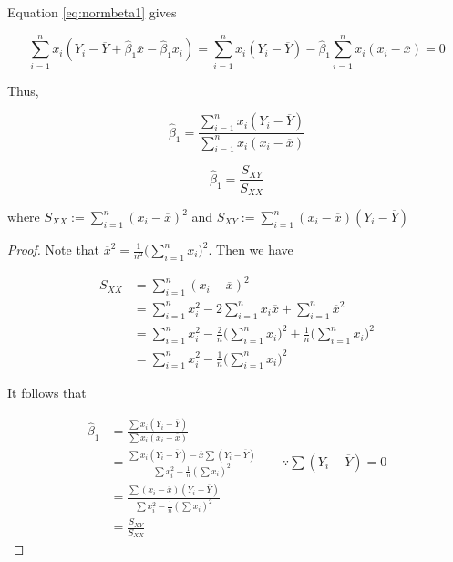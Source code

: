 \documentclass[]{book}
\theoremstyle{definition}
\theoremstyle{definition}
\theoremstyle{definition}
\theoremstyle{remark}
\let\BeginKnitrBlock\begin \let\EndKnitrBlock\end
\begin{document}
Equation \eqref{eq:normbeta1} gives

\[\sum_{i = 1}^n x_i (Y_i - \overline{Y} + \hat\beta_1\overline{x} - \hat\beta_1 x_i) = \sum_{i = 1}^n x_i(Y_i - \overline{Y}) - \hat\beta_1\sum_{i = 1}^n x_i (x_i - \overline{x}) = 0\]

Thus,

\[\hat\beta_1 = \frac{\sum\limits_{i = 1}^nx_i(Y_i - \overline{Y})}{\sum\limits_{i = 1}^n x_i (x_i - \overline{x})}\]

\BeginKnitrBlock{remark}
\iffalse{} {Remark. } \fi{}\[\hat\beta_1 = \frac{S_{XY}}{S_{XX}}\]

where \(S_{XX} := \sum\limits_{i = 1}^n (x_i - \overline{x})^2\) and
\(S_{XY} := \sum\limits_{i = 1}^n (x_i - \overline{x})(Y_i - \overline{Y})\)
\EndKnitrBlock{remark}

\BeginKnitrBlock{proof}
\iffalse{} {Proof. } \fi{}Note that
\(\overline{x}^2 = \frac{1}{n^2}\bigg(\sum\limits_{i = 1}^n x_i\bigg)^2\).
Then we have

\begin{equation}
  \begin{split}
    S_{XX} & = \sum_{i = 1}^n (x_i - \overline{x})^2 \\
    & = \sum_{i = 1}^n x_i^2 - 2\sum_{i = 1}^n x_i \overline{x} + \sum_{i = 1}^n\overline{x}^2 \\
    & = \sum_{i = 1}^n x_i^2 - \frac{2}{n}\bigg(\sum\limits_{i = 1}^n x_i\bigg)^2 + \frac{1}{n}\bigg(\sum\limits_{i = 1}^n x_i\bigg)^2 \\
    & = \sum_{i = 1}^n x_i^2 - \frac{1}{n}\bigg(\sum\limits_{i = 1}^n x_i\bigg)^2
  \end{split}
  \label{eq:sxx}
\end{equation}

It follows that

\begin{equation*}
  \begin{split}
    \hat\beta_1 & = \frac{\sum x_i(Y_i - \overline{Y})}{\sum x_i (x_i - \overline{x})} \\
    & = \frac{\sum x_i (Y_i - \overline{Y}) - \overline{x}\sum (Y_i - \overline{Y})}{\sum x_i^2 - \frac{1}{n} (\sum x_i)^2} \qquad \because \sum (Y_i - \overline{Y}) = 0 \\
    & = \frac{\sum (x_i - \overline{x})(Y_i - \overline{Y})}{\sum x_i^2 - \frac{1}{n} (\sum x_i)^2} \\
    & = \frac{S_{XY}}{S_{XX}}
  \end{split}
\end{equation*}
\EndKnitrBlock{proof}
\end{document}
